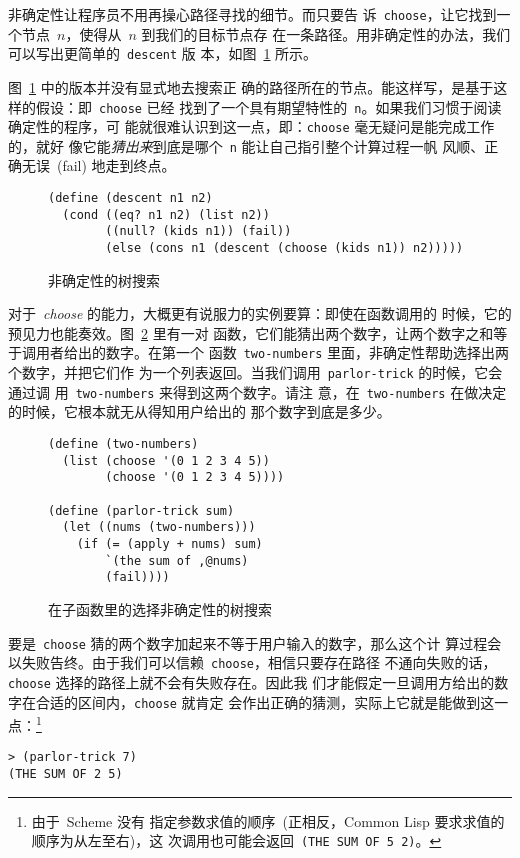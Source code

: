 非确定性让程序员不用再操心路径寻找的细节。而只要告
诉~\texttt{choose}，让它找到一个节点~$n$，使得从~$n$ 到我们的目标节点存
在一条路径。用非确定性的办法，我们可以写出更简单的~\texttt{descent} 版
本，如图~\ref{fig:nondeterministic_tree_search} 所示。

图~\ref{fig:nondeterministic_tree_search} 中的版本并没有显式地去搜索正
确的路径所在的节点。能这样写，是基于这样的假设：即~\texttt{choose} 已经
找到了一个具有期望特性的~\texttt{n}。如果我们习惯于阅读确定性的程序，可
能就很难认识到这一点，即：\texttt{choose} 毫无疑问是能完成工作的，就好
像它能\emph{猜出来}到底是哪个~\texttt{n} 能让自己指引整个计算过程一帆
风顺、正确无误~(fail) 地走到终点。

\begin{figure}
\begin{lstlisting}
(define (descent n1 n2)
  (cond ((eq? n1 n2) (list n2))
        ((null? (kids n1)) (fail))
        (else (cons n1 (descent (choose (kids n1)) n2)))))
\end{lstlisting}
\caption{非确定性的树搜索}
\label{fig:nondeterministic_tree_search}
\end{figure}

对于~\emph{choose} 的能力，大概更有说服力的实例要算：即使在函数调用的
时候，它的预见力也能奏效。图~\ref{fig:choice_in_a_subroutine} 里有一对
函数，它们能猜出两个数字，让两个数字之和等于调用者给出的数字。在第一个
函数~\texttt{two-numbers} 里面，非确定性帮助选择出两个数字，并把它们作
为一个列表返回。当我们调用~\texttt{parlor-trick} 的时候，它会通过调
用~\texttt{two-numbers} 来得到这两个数字。请注
意，在~\texttt{two-numbers} 在做决定的时候，它根本就无从得知用户给出的
那个数字到底是多少。

\begin{figure}
\begin{lstlisting}
(define (two-numbers)
  (list (choose '(0 1 2 3 4 5))
        (choose '(0 1 2 3 4 5))))

(define (parlor-trick sum)
  (let ((nums (two-numbers)))
    (if (= (apply + nums) sum)
        `(the sum of ,@nums)
        (fail))))
\end{lstlisting}
\caption{在子函数里的选择非确定性的树搜索}
\label{fig:choice_in_a_subroutine}
\end{figure}


要是~\texttt{choose} 猜的两个数字加起来不等于用户输入的数字，那么这个计
算过程会以失败告终。由于我们可以信赖~\texttt{choose}，相信只要存在路径
不通向失败的话，\texttt{choose} 选择的路径上就不会有失败存在。因此我
们才能假定一旦调用方给出的数字在合适的区间内，\texttt{choose} 就肯定
会作出正确的猜测，实际上它就是能做到这一点：\footnote{由于~Scheme 没有
  指定参数求值的顺序~(正相反，Common Lisp 要求求值的顺序为从左至右)，这
  次调用也可能会返回~\texttt{(THE SUM OF 5 2)}。}
\begin{lstlisting}
> (parlor-trick 7)
(THE SUM OF 2 5)
\end{lstlisting}

